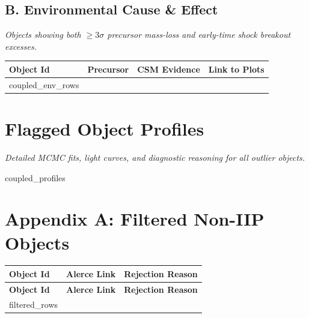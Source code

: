 \documentclass[11pt,a4paper]{article}
\begin{document}
\subsection*{B. Environmental Cause \& Effect}
\textit{Objects showing both $\ge 3\sigma$ precursor mass-loss and early-time shock breakout excesses.}
\begin{table}[H]
\centering
\begin{tabular}{@{}lccc@{}}
\toprule
\textbf{Object Id} & \textbf{Precursor} & \textbf{CSM Evidence} & \textbf{Link to Plots} \\ \midrule
{coupled_env_rows}\end{tabular}
\end{table}

\clearpage

\section{Flagged Object Profiles}
\textit{Detailed MCMC fits, light curves, and diagnostic reasoning for all outlier objects.}

{coupled_profiles}

\clearpage

\section*{Appendix A: Filtered Non-IIP Objects}

\begin{longtable}{@{}lll@{}}
\toprule
\textbf{Object Id} & \textbf{Alerce Link} & \textbf{Rejection Reason} \\ \midrule
\endfirsthead
\toprule
\textbf{Object Id} & \textbf{Alerce Link} & \textbf{Rejection Reason} \\ \midrule
\endhead
\bottomrule
\endfoot
{filtered_rows}\end{longtable}
\end{document}
